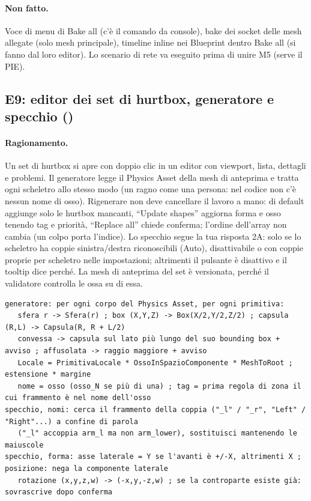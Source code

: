 \documentclass[11pt,a4paper]{article}
\newcommand{\code}[1]{\texttt{\detokenize{#1}}}
\begin{document}
\paragraph{Non fatto.} Voce di menu di Bake all (c'è il comando da console), bake dei socket delle mesh allegate (solo mesh principale),
timeline inline nei Blueprint dentro Bake all (si fanno dal loro editor). Lo scenario di rete \code{scenario_hit_basic} va eseguito
prima di unire M5 (serve il PIE).

\subsection{E9: editor dei set di hurtbox, generatore e specchio (\code{4b325c8})}
\paragraph{Ragionamento.} Un set di hurtbox si apre con doppio clic in un editor con viewport, lista, dettagli e problemi. Il generatore
legge il Physics Asset della mesh di anteprima e tratta ogni scheletro allo stesso modo (un ragno come una persona: nel codice non c'è
nessun nome di osso). Rigenerare non deve cancellare il lavoro a mano: di default aggiunge solo le hurtbox mancanti, ``Update shapes''
aggiorna forma e osso tenendo tag e priorità, ``Replace all'' chiede conferma; l'ordine dell'array non cambia (un colpo porta l'indice).
Lo specchio segue la tua risposta 2A: solo se lo scheletro ha coppie sinistra/destra riconoscibili (Auto), disattivabile o con coppie
proprie per scheletro nelle impostazioni; altrimenti il pulsante è disattivo e il tooltip dice perché. La mesh di anteprima del set è
versionata, perché il validatore controlla le ossa su di essa.
\begin{lstlisting}
generatore: per ogni corpo del Physics Asset, per ogni primitiva:
   sfera r -> Sfera(r) ; box (X,Y,Z) -> Box(X/2,Y/2,Z/2) ; capsula (R,L) -> Capsula(R, R + L/2)
   convessa -> capsula sul lato più lungo del suo bounding box + avviso ; affusolata -> raggio maggiore + avviso
   Locale = PrimitivaLocale * OssoInSpazioComponente * MeshToRoot ; estensione * margine
   nome = osso (osso_N se più di una) ; tag = prima regola di zona il cui frammento è nel nome dell'osso
specchio, nomi: cerca il frammento della coppia ("_l" / "_r", "Left" / "Right"...) a confine di parola
   ("_l" accoppia arm_l ma non arm_lower), sostituisci mantenendo le maiuscole
specchio, forma: asse laterale = Y se l'avanti è +/-X, altrimenti X ; posizione: nega la componente laterale
   rotazione (x,y,z,w) -> (-x,y,-z,w) ; se la controparte esiste già: sovrascrive dopo conferma
\end{lstlisting}
\end{document}
